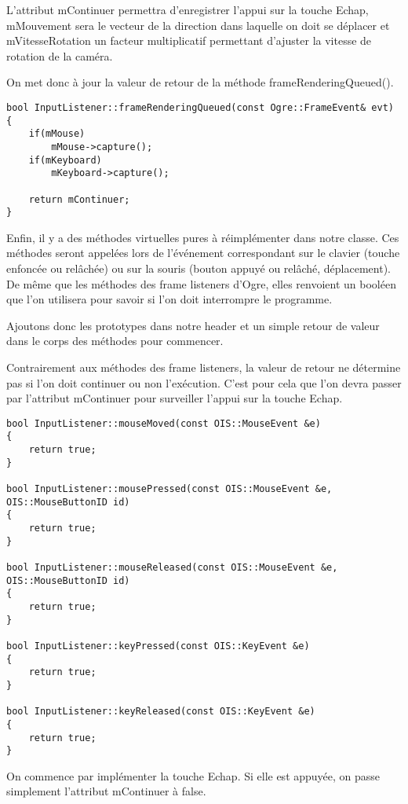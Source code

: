 \documentclass[10pt,a4paper]{report}
\begin{document}
L'attribut mContinuer permettra d'enregistrer l'appui sur la touche Echap, mMouvement sera le vecteur de la direction dans laquelle on doit se d\'eplacer et mVitesseRotation un facteur multiplicatif permettant d'ajuster la vitesse de rotation de la cam\'era.

On met donc \`a jour la valeur de retour de la m\'ethode frameRenderingQueued().

\begin{lstlisting}[caption={}]
bool InputListener::frameRenderingQueued(const Ogre::FrameEvent& evt)
{
    if(mMouse)
        mMouse->capture();
    if(mKeyboard)
        mKeyboard->capture();

    return mContinuer;
}
\end{lstlisting}

Enfin, il y a des m\'ethodes virtuelles pures \`a r\'eimpl\'ementer dans notre classe. Ces m\'ethodes seront appel\'ees lors de l'\'ev\'enement correspondant sur le clavier (touche enfonc\'ee ou rel\^ach\'ee) ou sur la souris (bouton appuy\'e ou rel\^ach\'e, d\'eplacement). De m\^eme que les m\'ethodes des frame listeners d'Ogre, elles renvoient un bool\'een que l'on utilisera pour savoir si l'on doit interrompre le programme.

Ajoutons donc les prototypes dans notre header et un simple retour de valeur dans le corps des m\'ethodes pour commencer.

Contrairement aux m\'ethodes des frame listeners, la valeur de retour ne d\'etermine pas si l'on doit continuer ou non l'ex\'ecution. C'est pour cela que l'on devra passer par l'attribut mContinuer pour surveiller l'appui sur la touche Echap.


\begin{lstlisting}[caption={M\'ethodes virtuelles appel\'ees lors d'un \'ev\`enement sur un p\'eriph\'erique}]
bool InputListener::mouseMoved(const OIS::MouseEvent &e)
{
    return true;
}

bool InputListener::mousePressed(const OIS::MouseEvent &e, OIS::MouseButtonID id)
{
    return true;
}

bool InputListener::mouseReleased(const OIS::MouseEvent &e, OIS::MouseButtonID id)
{
    return true;
}

bool InputListener::keyPressed(const OIS::KeyEvent &e)
{
    return true;
}

bool InputListener::keyReleased(const OIS::KeyEvent &e)
{
    return true;
}
\end{lstlisting}

On commence par impl\'ementer la touche Echap. Si elle est appuy\'ee, on passe simplement l'attribut mContinuer \`a false.
\end{document}
